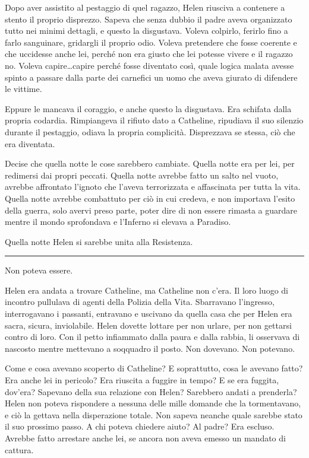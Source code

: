\documentclass[a4paper,oneside,11pt]{memoir}
\begin{document}
Dopo aver assistito al pestaggio di quel ragazzo, Helen riusciva a contenere a stento il proprio
disprezzo. Sapeva che senza dubbio il padre aveva organizzato tutto nei minimi dettagli, e questo la
disgustava. Voleva colpirlo, ferirlo fino a farlo sanguinare, gridargli il proprio odio. Voleva
pretendere che fosse coerente e che uccidesse anche lei, perché non era giusto che lei potesse
vivere e il ragazzo no. Voleva capire\dots capire perché fosse diventato così, quale logica malata
avesse spinto a passare dalla parte dei carnefici un uomo che aveva giurato di difendere le vittime.

Eppure le mancava il coraggio, e anche questo la disgustava. Era schifata dalla propria codardia.
Rimpiangeva il rifiuto dato a Catheline, ripudiava il suo silenzio durante il pestaggio, odiava la
propria complicità. Disprezzava se stessa, ciò che era diventata.

Decise che quella notte le cose sarebbero cambiate. Quella notte era per lei, per redimersi dai
propri peccati. Quella notte avrebbe fatto un salto nel vuoto, avrebbe affrontato l'ignoto che
l'aveva terrorizzata e affascinata per tutta la vita. Quella notte avrebbe combattuto per ciò in cui
credeva, e non importava l'esito della guerra, solo avervi preso parte, poter dire di non essere
rimasta a guardare mentre il mondo sprofondava e l'Inferno si elevava a Paradiso.

Quella notte Helen si sarebbe unita alla Resistenza.

\plainbreak{1}

Non poteva essere.

Helen era andata a trovare Catheline, ma Catheline non c'era. Il loro luogo di incontro pullulava di
agenti della Polizia della Vita. Sbarravano l'ingresso, interrogavano i passanti, entravano e
uscivano da quella casa che per Helen era sacra, sicura, inviolabile. Helen dovette lottare per non
urlare, per non gettarsi contro di loro. Con il petto infiammato dalla paura e dalla rabbia, li
osservava di nascosto mentre mettevano a soqquadro il posto. Non dovevano. Non potevano.

Come e cosa avevano scoperto di Catheline? E soprattutto, cosa le avevano fatto? Era anche lei in
pericolo? Era riuscita a fuggire in tempo? E se era fuggita, dov'era? Sapevano della sua relazione
con Helen? Sarebbero andati a prenderla? Helen non poteva rispondere a nessuna delle mille domande
che la tormentavano, e ciò la gettava nella disperazione totale. Non sapeva neanche quale sarebbe
stato il suo prossimo passo. A chi poteva chiedere aiuto? Al padre? Era escluso. Avrebbe fatto
arrestare anche lei, se ancora non aveva emesso un mandato di cattura.
\end{document}
